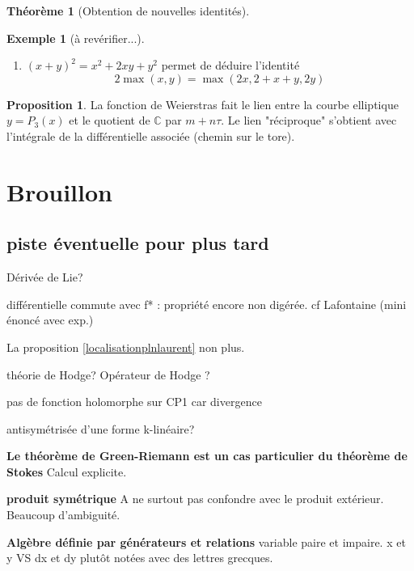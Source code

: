\documentclass{article}
\newcommand{\C}{\mathbb{C}} %
\theoremstyle{definition} %
\newtheorem{thm}{Théorème}
\newtheorem{prop}{Proposition}
\newtheorem{ex}{Exemple}
\newcommand{\1}{\mathbb{1}} %
\begin{document}
\begin{thm}[Obtention de nouvelles identités]

\end{thm}

\begin{ex}[à revérifier...]
    \begin{enumerate}
    \item $(x+y)^2=x^2 + 2xy + y^2$ permet de déduire l'identité
    $$2\max(x,y)=\max(2x,2+x+y,2y)$$

    \end{enumerate}

\end{ex}

\begin{prop}
La fonction de Weierstras fait le lien entre la courbe elliptique $y=P_3(x)$ et le quotient de $\C$ par $m+n \tau$.
Le lien "réciproque" s'obtient avec l'intégrale de la différentielle associée (chemin sur le tore).
\end{prop}



\section{Brouillon}

\subsection{piste éventuelle pour plus tard}

Dérivée de Lie?

différentielle commute avec f* : propriété encore non digérée.
cf Lafontaine (mini énoncé avec exp.)

La proposition \ref{localisationplnlaurent} non plus.

théorie de Hodge? Opérateur de Hodge ?

pas de fonction holomorphe sur CP1 car divergence 

antisymétrisée d'une forme k-linéaire?

\textbf{Le théorème de Green-Riemann est un cas particulier du théorème de Stokes}
Calcul explicite.

\textbf{produit symétrique}
A ne surtout pas confondre avec le produit extérieur. Beaucoup d'ambiguité.

\textbf{Algèbre définie par générateurs et relations}
variable paire et impaire.
x et y VS dx et dy plutôt notées avec des lettres grecques.
\end{document}
